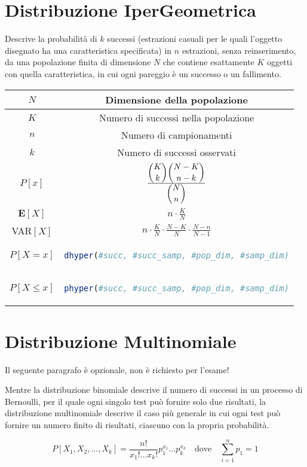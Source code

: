 \section{Distribuzione IperGeometrica}
\begin{tcolorbox}
Descrive la probabilità di \(k\) successi (estrazioni casuali per le quali l'oggetto disegnato ha una caratteristica specificata) in \(n\) estrazioni, senza reinserimento, da una popolazione finita di dimensione \(N\) che contiene esattamente \( K\) oggetti con quella caratteristica, in cui ogni pareggio è un successo o un fallimento.
\end{tcolorbox}
\begingroup
\setlength{\tabcolsep}{10pt} %
\renewcommand{\arraystretch}{1.5} %
\begin{center}
\begin{tabular}{ |c|c| } 
\hline
\(N\) & Dimensione della popolazione \\ \hline
\(K\) & Numero di successi nella popolazione \\ \hline
\(n\) & Numero di campionamenti  \\ \hline
\(k\) & Numero di successi osservati \\ \hline
\(P[x]\) & \(\frac{\dbinom{K}{k}\dbinom{N-K}{n-k}}{\dbinom{N}{n}}\)\\ \hline
\(\mathbf{E}[X]\) & \(n \cdot \frac{K}{N}\) \\ \hline
VAR\([X]\) & \(n \cdot \frac{K}{N} \cdot\frac{N-K}{N} \cdot \frac{N-n}{N-1}\) \\\hline\hline
\(P[X = x]\) & \begin{lstlisting}[language=R]
dhyper(#succ, #succ_samp, #pop_dim, #samp_dim)
\end{lstlisting} \\ \hline
\(P[X \leq x]\) & \begin{lstlisting}[language=R]
phyper(#succ, #succ_samp, #pop_dim, #samp_dim)
\end{lstlisting} \\ \hline
\end{tabular}
\end{center}
\endgroup



\section{Distribuzione Multinomiale}
\begin{tcolorbox}[title=NOTA]
Il seguente paragrafo è opzionale, non è richiesto per l'esame!
\end{tcolorbox}
\begin{tcolorbox}
Mentre la distribuzione binomiale descrive il numero di successi in un processo di Bernoulli, per il quale ogni singolo test può fornire solo due risultati, la distribuzione multinomiale descrive il caso più generale in cui ogni test può fornire un numero finito di risultati, ciascuno con la propria probabilità.
\end{tcolorbox}
\[P[X_1, X_2,...,X_k] = \frac{n!}{x_1!...x_k!}p_1^{x_1}...p_k^{x_k} \quad \text{dove} \quad \sum_{i = 1}^n p_1 = 1\]


